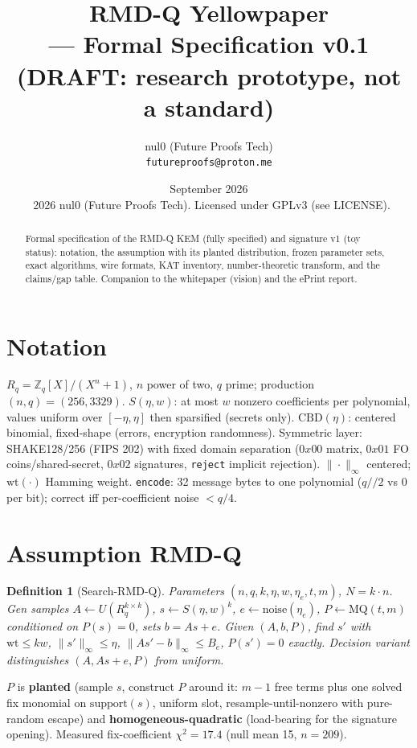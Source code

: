 \documentclass[11pt,a4paper]{article}
\title{RMD-Q Yellowpaper\\--- Formal Specification v0.1\\(DRAFT: research prototype, not a standard)}
\author{nul0 (Future Proofs Tech) \\ \texttt{futureproofs@proton.me}}
\date{September 2026 \\
\small \textcopyright\ 2026 nul0 (Future Proofs Tech). Licensed under GPLv3 (see LICENSE).}
\newtheorem{definition}{Definition}
\begin{document}
\maketitle

\begin{abstract}
Formal specification of the RMD-Q KEM (fully specified) and signature v1
(toy status): notation, the assumption with its planted distribution,
frozen parameter sets, exact algorithms, wire formats, KAT inventory,
number-theoretic transform, and the claims/gap table. Companion to the
whitepaper (vision) and the ePrint report.
\end{abstract}

\tableofcontents
\newpage

\section{Notation}
$R_q = \mathbb{Z}_q[X]/(X^n+1)$, $n$ power of two, $q$ prime; production
$(n,q)=(256,3329)$. $S(\eta,w)$: at most $w$ nonzero coefficients per
polynomial, values uniform over $[-\eta,\eta]$ then sparsified (secrets
only). $\mathrm{CBD}(\eta)$: centered binomial, fixed-shape (errors,
encryption randomness). Symmetric layer: SHAKE128/256 (FIPS 202) with
fixed domain separation ($0x00$ matrix, $0x01$ FO coins/shared-secret,
$0x02$ signatures, \texttt{reject} implicit rejection).
$\|{\cdot}\|_\infty$ centered; $\mathrm{wt}(\cdot)$ Hamming weight.
\texttt{encode}: 32 message bytes to one polynomial ($q//2$ vs $0$ per
bit); correct iff per-coefficient noise $< q/4$.

\section{Assumption RMD-Q}
\begin{definition}[Search-RMD-Q]
Parameters $(n,q,k,\eta,w,\eta_e,t,m)$, $N=k{\cdot}n$.
\textsf{Gen} samples $A\gets U(R_q^{k\times k})$, $s\gets S(\eta,w)^k$,
$e\gets\mathrm{noise}(\eta_e)$, $P\gets\mathrm{MQ}(t,m)$ conditioned on
$P(s)=0$, sets $b=As+e$. Given $(A,b,P)$, find $s'$ with
$\mathrm{wt}\le kw$, $\|s'\|_\infty\le\eta$, $\|As'-b\|_\infty\le B_e$,
$P(s')=0$ exactly. Decision variant distinguishes
$(A,As+e,P)$ from uniform.
\end{definition}
$P$ is \textbf{planted} (sample $s$, construct $P$ around it: $m{-}1$ free
terms plus one solved fix monomial on $\mathrm{support}(s)$, uniform slot,
resample-until-nonzero with pure-random escape) and
\textbf{homogeneous-quadratic} (load-bearing for the signature opening).
Measured fix-coefficient $\chi^2=17.4$ (null mean 15, $n=209$).
\end{document}
